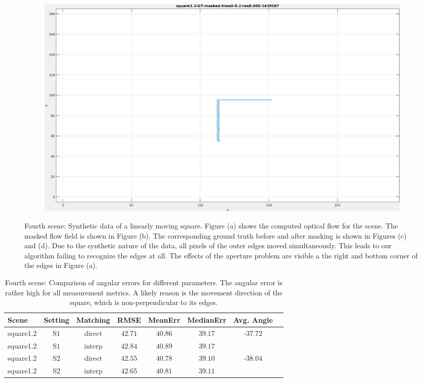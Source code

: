 \begin{figure}[tb]
\begin{subfigure}{.45\textwidth}
  \caption{}
\end{subfigure}
\begin{subfigure}{.45\textwidth}
  \centering
  \includegraphics[height=.6\linewidth]{figs/square12/square12-GT-masked-1.png}
  \caption{}
\end{subfigure}
\caption[Fourth scene: Synthetic data of a linearly moving square.]{Fourth scene: Synthetic data of a linearly moving square.
Figure (a) shows the computed optical flow for the scene. 
The masked flow field is shown in Figure (b).
The corresponding ground truth before and after masking is shown in Figures (c) and (d). 
Due to the synthetic nature of the data, all pixels of the outer edges moved simultaneously.
This leads to our algorithm failing to recognize the edges at all.
The effects of the aperture problem are visible a the right and bottom corner of the edges in Figure (a).
}
\label{fig:square12-snapshots}
\end{figure}

\begin{table}[tb]
	\centering
		\begin{tabular}{lccccccc}
Scene & Setting & Matching & RMSE & MeanErr & MedianErr & Avg. Angle \\
\hline  \hline
square1.2 & S$1$ & direct & $42.71$ & $40.86$ & $39.17$ & -$37.72$ & \\
square1.2 & S$1$ & interp & $42.84$ & $40.89$ & $39.17$ &  & \\
square1.2 & S$2$ & direct & $42.55$ & $40.78$ & $39.10$ & -$38.04$ & \\
square1.2 & S$2$ & interp & $42.65$ & $40.81$ & $39.11$ &  & \\
		\end{tabular}
	\caption[Fourth scene: Comparison of angular errors for different parameters.]{Fourth scene: Comparison of angular errors for different parameters.
	The angular error is rather high for all measurement metrics.
	A likely reason is the movement direction of the square, which is non-perpendicular to its edges.}
	\label{tab:error_comparison_square12}
\end{table}

